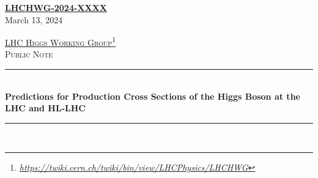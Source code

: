 \documentclass[11pt]{article}
\newcommand{\HRule}{\rule{\linewidth}{0.5mm}}
\begin{document}
\hypersetup{pageanchor=false}

\thispagestyle{empty}
 \begin{titlepage}

	\begin{flushright}
	  {\large
            \textbf{\href{https://https://cds.cern.ch/record/XXXXX}{LHCHWG-2024-XXXX}}} \\[0.5cm]	
		{\large 	\textrm{March 13, 2024}} \\[2.0cm]
	\end{flushright}

	\begin{center}

	\textsc{\Large 	\href{https://twiki.cern.ch/twiki/bin/view/LHCPhysics/LHCHWG}{LHC Higgs Working Group}\footnote{\href{https://twiki.cern.ch/twiki/bin/view/LHCPhysics/LHCHWG}{\sl https://twiki.cern.ch/twiki/bin/view/LHCPhysics/LHCHWG}}} \\[0.5cm]
	\textsc{\Large 	Public Note} \\[1.5cm]
	
	\HRule \\[0.9cm]
	\textbf{\Large Predictions for Production Cross Sections of the Higgs Boson at the LHC and HL-LHC} \\[1.0cm]
	\HRule \\[1.5cm]


\end{center}
\end{titlepage}
\end{document}
